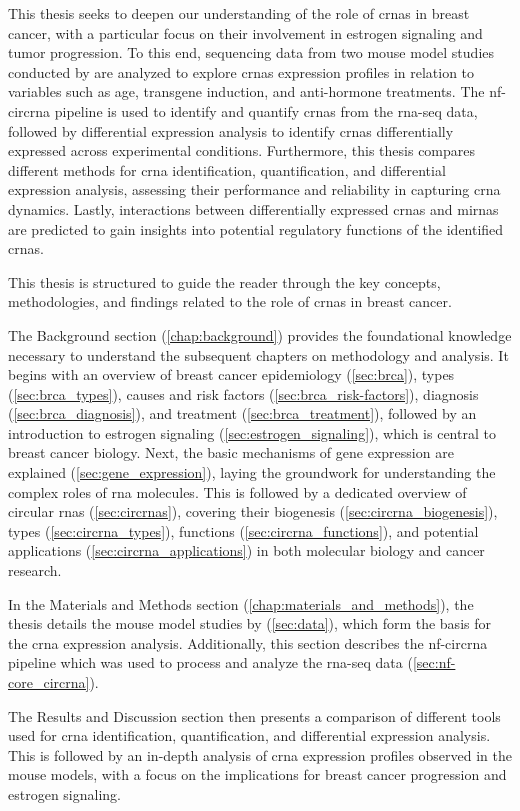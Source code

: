This thesis seeks to deepen our understanding of the role of \glspl{crna} in
breast cancer, with a particular focus on their involvement in estrogen
signaling and tumor progression.
To this end, sequencing data from two mouse model studies conducted by
\textcite{furth_esr1_2023,furth_overexpression_2023} are analyzed to explore
\glspl{crna} expression profiles in relation to variables such as age,
transgene induction, and anti-hormone treatments.
The \gls{nf-circrna} pipeline\supercite{digby_nf-corecircrna_2023} is used to
identify and quantify \glspl{crna} from the \gls{rna-seq} data, followed by
differential expression analysis to identify \glspl{crna} differentially
expressed across experimental conditions.
Furthermore, this thesis compares different methods for \gls{crna}
identification, quantification, and differential expression analysis, assessing
their performance and reliability in capturing \gls{crna} dynamics.
Lastly, interactions between differentially expressed \glspl{crna} and
\glspl{mirna} are predicted to gain insights into potential regulatory
functions of the identified \glspl{crna}.

\medskip \noindent This thesis is structured to guide the reader through the
key concepts, methodologies, and findings related to the role of \glspl{crna}
in breast cancer.

The Background section (\cref{chap:background}) provides the foundational
knowledge necessary to understand the subsequent chapters on methodology and
analysis.
It begins with an overview of breast cancer epidemiology (\cref{sec:brca}),
types (\cref{sec:brca_types}), causes and risk factors
(\cref{sec:brca_risk-factors}), diagnosis (\cref{sec:brca_diagnosis}), and
treatment (\cref{sec:brca_treatment}), followed by an introduction to estrogen
signaling (\cref{sec:estrogen_signaling}), which is central to breast cancer
biology.
Next, the basic mechanisms of gene expression are explained
(\cref{sec:gene_expression}), laying the groundwork for understanding the
complex roles of \gls{rna} molecules.
This is followed by a dedicated overview of circular \glspl{rna}
(\cref{sec:circrnas}), covering their biogenesis
(\cref{sec:circrna_biogenesis}), types (\cref{sec:circrna_types}), functions
(\cref{sec:circrna_functions}), and potential applications
(\cref{sec:circrna_applications}) in both molecular biology and cancer
research.


In the Materials and Methods section (\cref{chap:materials_and_methods}), the
thesis details the mouse model studies by
\textcite{furth_esr1_2023,furth_overexpression_2023} (\cref{sec:data}), which
form the basis for the \gls{crna} expression analysis.
Additionally, this section describes the \gls{nf-circrna}
pipeline\supercite{digby_nf-corecircrna_2023} which was used to process and
analyze the \gls{rna-seq} data (\cref{sec:nf-core_circrna}).

The Results and Discussion section then presents a comparison of different
tools used for \gls{crna} identification, quantification, and differential
expression analysis.
This is followed by an in-depth analysis of \gls{crna} expression profiles
observed in the mouse models, with a focus on the implications for breast
cancer progression and estrogen signaling.
